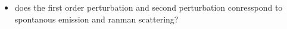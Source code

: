 \begin{itemize}
\item  does the first order perturbation and second perturbation conresspond to spontanous emission and ranman scattering?
\end{itemize}